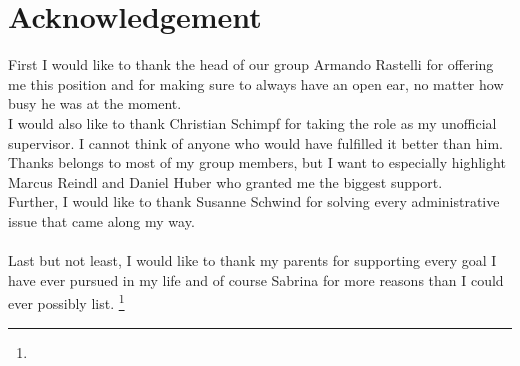 \chapter*{Acknowledgement}
\label{cha:acknowledgment}

First I would like to thank the head of our group Armando Rastelli for offering me this position and for making sure to always have an open ear, no matter how busy he was at the moment.\\
I would also like to thank Christian Schimpf for taking the role as my unofficial supervisor. 
I cannot think of anyone who would have fulfilled it better than him.\\
Thanks belongs to most of my group members, but I want to especially highlight Marcus Reindl and Daniel Huber who granted me the biggest support. \\
Further, I would like to thank Susanne Schwind for solving every administrative issue that came along my way.\\
\\
Last but not least, I would like to thank my parents for supporting every goal I have ever pursued in my life and of course Sabrina for more reasons than I could ever possibly list.
\footnote{\mycolophon}